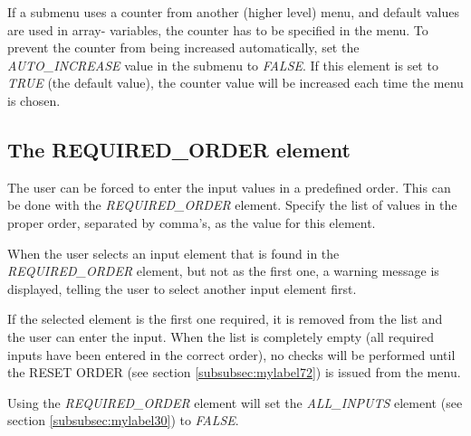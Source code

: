 \documentclass[a4paper]{book}
\newcommand{\vs}{\vspace{3mm}}
\begin{document}
If a submenu uses a counter from another (higher level) menu, and default 
values are used in array- variables, the counter has to be specified in the 
menu. To prevent the counter from being increased automatically, set the 
\textsl{AUTO{\_}INCREASE} value in the submenu to \textsl{FALSE}. If this element is set to 
\textsl{TRUE} (the default value), the counter value will be increased each time the 
menu is chosen.

\subsection{The REQUIRED{\_}ORDER element}
\label{subsubsec:mylabel29}

The user can be forced to enter the input values in a predefined order. This 
can be done with the \textsl{REQUIRED{\_}ORDER} element. Specify the list of values 
in the proper order, separated by comma's, as the value for this element.

\vs

When the user selects an input element that is found in the 
\linebreak\textsl{REQUIRED{\_}ORDER} element, but not as the first one, a warning message is 
displayed, telling the user to select another input element first.

\vs

If the selected element is the first one required, it is removed from the 
list and the user can enter the input. When the list is completely empty 
(all required inputs have been entered in the correct order), no checks will 
be performed until the \textsf{RESET ORDER} (see section 
\ref{subsubsec:mylabel72}) is issued from the menu.

\vs

Using the \textsl{REQUIRED{\_}ORDER} element will set the \textsl{ALL{\_}INPUTS} element (see 
section \ref{subsubsec:mylabel30}) to \textsl{FALSE}.
\end{document}
